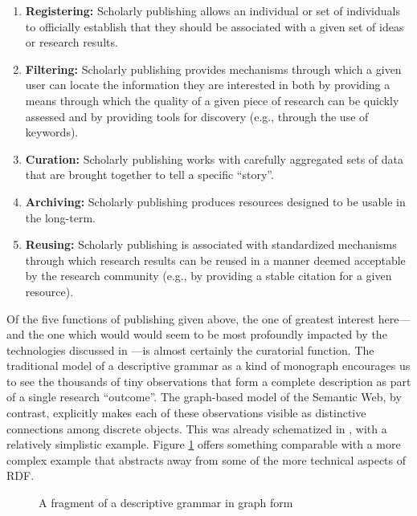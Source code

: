 \begin{enumerate}
\label{Publishing}

	\item{{\bf Registering:} Scholarly publishing allows an individual or
	set of individuals to officially establish that they should be associated
	with a given set of ideas or research results. \label{Registering}}
	
	\item{{\bf Filtering:} Scholarly publishing provides mechanisms through
	which a given user can locate the information they are interested in
	both by providing a means through which the quality of a given piece of
	research can be quickly
	assessed and by providing tools for discovery (e.g., through the use of
	keywords).}

	\item{{\bf Curation:} Scholarly publishing works with carefully aggregated
	sets of data that are brought together to tell a specific ``story''.
	\label{Curation}}
	
	\item{{\bf Archiving:} Scholarly publishing produces resources designed to
	be usable in the long-term.}
	
	\item{{\bf Reusing:} Scholarly publishing is associated with standardized
	mechanisms through which research results can be reused in a manner deemed
	acceptable by the research community (e.g., by providing a stable
	citation for a given resource).}

\end{enumerate}
	

Of the five functions of publishing given above, the one of
greatest interest here---and the one which would would seem to be most
profoundly impacted by the technologies discussed in ---is almost
certainly the curatorial function. The traditional model of a
descriptive grammar as a kind of monograph encourages us to see the thousands of
tiny observations that form a complete description as part
of a single research ``outcome''. The graph-based model of the Semantic Web, by
contrast, explicitly makes each of these observations visible as distinctive
connections among discrete objects. This was already schematized in
, with a relatively simplistic example. Figure \ref{Analysis}
offers something comparable with a more complex example that abstracts away from
some of the more technical aspects of RDF.

\begin{figure}[ht]
\centering
{}
\caption{A fragment of a descriptive grammar in graph form \label{Analysis}}
\end{figure}

